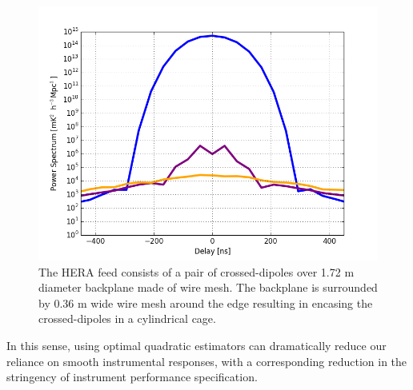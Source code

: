 \documentclass[twocolumn]{emulateapj}
\begin{document}
    \begin{figure}
    \centering
    \includegraphics[width=\linewidth]{GB_reflectometry_part3/plot/figure_cov_weight.png}
    \caption{The HERA feed consists of a pair of crossed-dipoles over 1.72 m diameter backplane made of wire mesh. The backplane is surrounded by 0.36 m wide wire mesh around the edge resulting in encasing the crossed-dipoles in a cylindrical cage.}
    \label{fig:cov_weight}
    \end{figure}
    In this sense, using optimal quadratic estimators can dramatically 
    reduce our reliance on smooth instrumental responses, with a corresponding reduction
    in the stringency of instrument performance specification.
    
\end{document}
